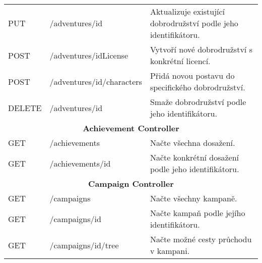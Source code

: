 \begin{longtable}{|l|l|p{}|}
    PUT             & /adventures/{id}            & Aktualizuje existující dobrodružství podle jeho identifikátoru.                                                                            \\
    POST            & /adventures/{idLicense}     & Vytvoří nové dobrodružství s konkrétní licencí.                                                                                            \\
    POST            & /adventures/{id}/characters & Přidá novou postavu do specifického dobrodružství.                                                                                         \\
    DELETE          & /adventures/{id}            & Smaže dobrodružství podle jeho identifikátoru.                                                                                             \\
    \hline
    \multicolumn{3}{|c|}{\textbf{Achievement Controller}}                                                                                                                                      \\
    \hline
    GET             & /achievements               & Načte všechna dosažení.                                                                                                                    \\
    GET             & /achievements/{id}          & Načte konkrétní dosažení podle jeho identifikátoru.                                                                                        \\
    \hline
    \multicolumn{3}{|c|}{\textbf{Campaign Controller}}                                                                                                                                         \\
    \hline
    GET             & /campaigns                  & Načte všechny kampaně.                                                                                                                     \\
    GET             & /campaigns/{id}             & Načte kampaň podle jejího identifikátoru.                                                                                                  \\
    GET             & /campaigns/{id}/tree        & Načte možné cesty průchodu v kampani.                                                                                                      \\

\end{longtable}
